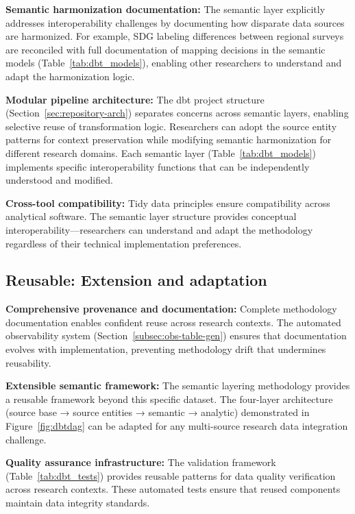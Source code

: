 \documentclass{article}
\begin{document}
\textbf{Semantic harmonization documentation:} The semantic layer explicitly addresses interoperability challenges by documenting how disparate data sources are harmonized. For example, SDG labeling differences between regional surveys are reconciled with full documentation of mapping decisions in the semantic models (Table~\ref{tab:dbt_models}), enabling other researchers to understand and adapt the harmonization logic.

\textbf{Modular pipeline architecture:} The dbt project structure (Section~\ref{sec:repository-arch}) separates concerns across semantic layers, enabling selective reuse of transformation logic. Researchers can adopt the source entity patterns for context preservation while modifying semantic harmonization for different research domains. Each semantic layer (Table~\ref{tab:dbt_models}) implements specific interoperability functions that can be independently understood and modified.

\textbf{Cross-tool compatibility:} Tidy data principles ensure compatibility across analytical software. The semantic layer structure provides conceptual interoperability—researchers can understand and adapt the methodology regardless of their technical implementation preferences.

\subsection{Reusable: Extension and adaptation}

\textbf{Comprehensive provenance and documentation:} Complete methodology documentation enables confident reuse across research contexts. The automated observability system (Section~\ref{subsec:obs-table-gen}) ensures that documentation evolves with implementation, preventing methodology drift that undermines reusability.

\textbf{Extensible semantic framework:} The semantic layering methodology provides a reusable framework beyond this specific dataset. The four-layer architecture (source base → source entities → semantic → analytic) demonstrated in Figure~\ref{fig:dbtdag} can be adapted for any multi-source research data integration challenge.

\textbf{Quality assurance infrastructure:} The validation framework (Table~\ref{tab:dbt_tests}) provides reusable patterns for data quality verification across research contexts. These automated tests ensure that reused components maintain data integrity standards.
\end{document}
